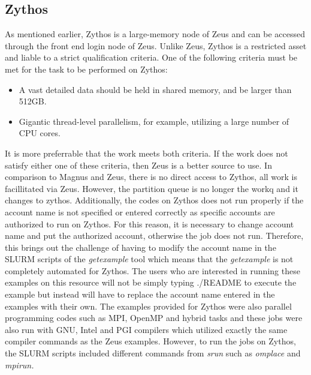\subsection{Zythos}
As mentioned earlier, Zythos is a large-memory node of Zeus and can be accessed through the front end login node of Zeus. Unlike Zeus, Zythos is a 
restricted asset and liable to a strict qualification criteria. One of the following criteria must be met for the task to be performed on Zythos:

\begin{itemize}
\item A vast detailed data should be held in shared memory, and be larger than 512GB.
\item Gigantic thread-level parallelism, for example, utilizing a large number of CPU cores.
\end{itemize}

It is more preferrable that the work meets both criteria. If the work does not satisfy either one of these criteria, then Zeus is a better source to
use. In comparison to  Magnus and Zeus, there is no direct access to Zythos, all work is facillitated via Zeus. However, the partition queue is no longer
the workq and it changes to zythos. Additionally, the codes on Zythos does not run properly if the account name is not specified or 
entered correctly as specific accounts are authorized to run on Zythos. For this reason, it is necessary to change account name and put the authorized 
account, otherwise the job does not run. Therefore, this brings out the challenge of having to modify the account name in the SLURM scripts of the 
\emph{getexample} tool which means that the \emph{getexample} is not completely automated for Zythos. The users who are interested in running these 
examples on this resource will not be simply typing ./README to execute the example but instead will have to replace the account name entered in the 
examples with their own. The examples provided for Zythos were also parallel programming codes such as MPI, OpenMP and hybrid tasks and these jobs were 
also run with GNU, Intel and PGI compilers which utilized exactly the same compiler commands as the Zeus examples. However, to run the jobs on Zythos, 
the SLURM scripts included different commands from \emph{srun} such as \emph{omplace} and \emph{mpirun.} 

